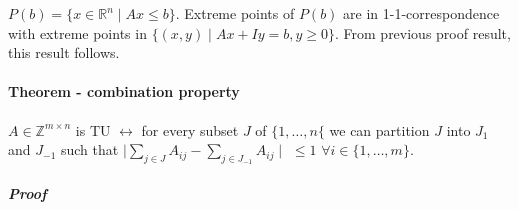 \documentclass[main]{subfiles}
\begin{document}
$P(b) = \{x \in \mathbb{R}^{n} \mid Ax \leq b \}$. Extreme points of $P(b)$ are in 1-1-correspondence with extreme points in $\{(x,y) \mid Ax + Iy = b, y \geq 0 \}$. From previous proof result, this result follows.

\paragraph{Theorem - combination property} $A \in \mathbb{Z}^{m \times n}$ is TU $\leftrightarrow$ for every subset $J$ of $\{1, \dots, n\{$ we can partition $J$ into $J_{1}$ and $J_{-1}$ such that $\mid \sum_{j \in J} A_{ij} - \sum_{j \in J_{-1}} A_{ij} \mid$ $\leq 1$ $\forall i \in \{1, \dots, m\}$.

\subparagraph{Proof}


\end{document}
